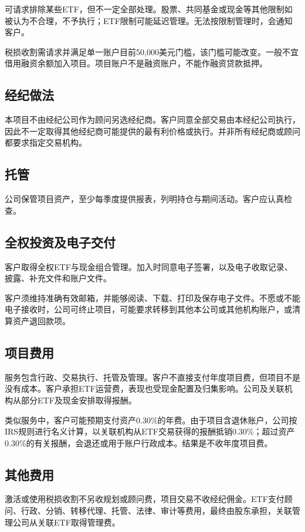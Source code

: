 \documentclass[UTF8,fontset=none,11pt,a4paper]{ctexart}
\begin{document}
可请求排除某些ETF，但不一定全部处理。股票、共同基金或现金等其他限制如被认为不合理，不予执行；ETF限制可能延迟管理。无法按限制管理时，会通知客户。


税损收割需请求并满足单一账户目前50,000美元门槛，该门槛可能改变。一般不宜借用融资余额加入项目。项目账户不是融资账户，不能作融资贷款抵押。


\subsection*{经纪做法}
本项目不由经纪公司作为顾问另选经纪商。客户同意全部交易由本经纪公司执行，因此不一定取得其他经纪商可能提供的最有利价格或执行。并非所有经纪商或顾问都要求指定交易机构。


\subsection*{托管}
公司保管项目资产，至少每季度提供报表，列明持仓与期间活动。客户应认真检查。


\subsection*{全权投资及电子交付}
客户取得全权ETF与现金组合管理。加入时同意电子签署，以及电子收取记录、披露、补充文件和账户文件。


客户须维持准确有效邮箱，并能够阅读、下载、打印及保存电子文件。不愿或不能电子接收时，公司可终止项目，可能要求转移到其他本公司或其他机构账户，或清算资产退回款项。


\subsection*{项目费用}
服务包含行政、交易执行、托管及管理。客户不直接支付年度项目费，但项目不是没有成本。客户承担ETF运营费，表现也受现金配置及归集影响。公司及关联机构从部分ETF及现金安排取得报酬。


类似服务中，客户可能预期支付资产0.30\%的年费。由于项目含退休账户，公司按IRS规则进行名义计算，以关联机构从ETF交易获得的报酬抵销0.30\%；超过资产0.30\%的有关报酬，会退还或用于账户行政成本。结果是不收年度项目费。


\subsection*{其他费用}
激活或使用税损收割不另收规划或顾问费，项目交易不收经纪佣金。ETF支付顾问、行政、分销、转移代理、托管、法律、审计等费用，最终由股东承担，关联管理公司从关联ETF取得管理费。
\end{document}
